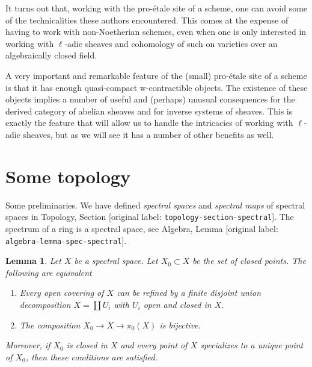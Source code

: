 \documentclass[10pt,a4paper]{article}
\theoremstyle{plain}
\newtheorem{lemma}[subsection]{Lemma}
\theoremstyle{definition}
\theoremstyle{remark}
\numberwithin{equation}{subsection}
\begin{document}
\medskip\noindent
It turns out that, working with the pro-\'etale site of a scheme,
one can avoid some of the technicalities these authors encountered.
This comes at the expense of having to work with non-Noetherian schemes,
even when one is only interested in working with $\ell$-adic sheaves
and cohomology of such on varieties over an algebraically closed field.

\medskip\noindent
A very important and remarkable feature of the
(small) pro-\'etale site of a scheme is
that it has enough quasi-compact w-contractible objects. The existence
of these objects implies
a number of useful and (perhaps) unusual consequences for the derived category
of abelian sheaves and for inverse systems of sheaves.
This is exactly the feature that will allow us to handle
the intricacies of working with $\ell$-adic sheaves, but as we
will see it has a number of other benefits as well.




\section{Some topology}
\label{section-topology}

\noindent
Some preliminaries. We have defined {\it spectral spaces} and
{\it spectral maps} of spectral spaces in
Topology, Section \textnormal{[original label: \nolinkurl{topology-section-spectral}]}.
The spectrum of a ring is a spectral space, see
Algebra, Lemma \textnormal{[original label: \nolinkurl{algebra-lemma-spec-spectral}]}.

\begin{lemma}
\label{lemma-spectral-split}
Let $X$ be a spectral space. Let $X_0 \subset X$ be the set of closed points.
The following are equivalent
\begin{enumerate}
\item Every open covering of $X$ can be refined by a finite
disjoint union decomposition $X = \coprod U_i$ with $U_i$
open and closed in $X$.
\item The composition $X_0 \to X \to \pi_0(X)$ is bijective.
\end{enumerate}
Moreover, if $X_0$ is closed in $X$ and every point of $X$ specializes
to a unique point of $X_0$, then these conditions are satisfied.
\end{lemma}
\end{document}
